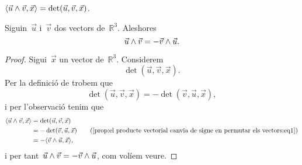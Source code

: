 \documentclass[../../main.tex]{subfiles}
\begin{document}
    \begin{observation}
        \label{obs:fórmula del determinant segons el producte vectorial i el producte escalar}
        \(\prodesc{\vec{u}\prodvec\vec{v}}{\vec{x}}=\det(\vec{u},\vec{v},\vec{x})\).
    \end{observation}
    \begin{proposition}
    \label{prop:el producte vectorial canvia de signe en permutar els vectors}
        Siguin~\(\vec{u}\) i~\(\vec{v}\) dos vectors de~\(\mathbb{R}^{3}\).
        Aleshores
        \[
            \vec{u}\mathbin{\wedge}\vec{v}=-\vec{v}\mathbin{\wedge}\vec{u}.
        \]
        \begin{proof}
            Sigui~\(\vec{x}\) un vector de~\(\mathbb{R}^{3}\).
            Considerem
            \[
                \det(\vec{u},\vec{v},\vec{x}).
            \]
            Per la definició de  trobem que %
            \begin{equation}
                \label{prop:el producte vectorial canvia de signe en permutar els vectors:eq1}
                \det(\vec{u},\vec{v},\vec{x})=-\det(\vec{v},\vec{u},\vec{x}),
            \end{equation}
            i per l'observació  tenim que
            \begin{align*}
                \prodesc{\vec{u}\prodvec\vec{v}}{\vec{x}}&=\det(\vec{u},\vec{v},\vec{x}) \\
                &=-\det(\vec{v},\vec{u},\vec{x}) \tag{\ref{prop:el producte vectorial canvia de signe en permutar els vectors:eq1}}\\
                &=-\prodesc{\vec{v}\prodvec\vec{u}}{\vec{x}},
            \end{align*}
            i per tant~\(\vec{u}\mathbin{\wedge}\vec{v}=-\vec{v}\mathbin{\wedge}\vec{u}\), com volíem veure.
        \end{proof}
    \end{proposition}
\end{document}
